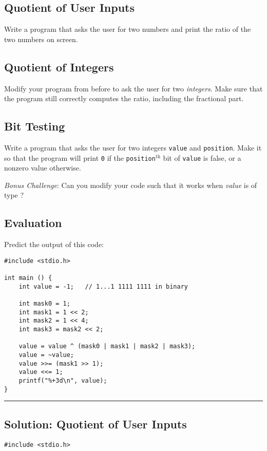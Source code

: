{\subsection*{Quotient of User Inputs}
Write a program that asks the user for two numbers and print the ratio of the two numbers on screen.

\subsection*{Quotient of Integers}
Modify your program from before to ask the user for two \emph{integers}. Make sure that the program still correctly computes the ratio, including the fractional part.

\subsection*{Bit Testing}
Write a program that asks the user for two integers \texttt{value} and \texttt{position}. Make it so that the program will print \texttt{0} if the \texttt{position}$^\text{th}$ bit of \texttt{value} is false, or a nonzero value otherwise.

\emph{Bonus Challenge}: Can you modify your code such that it works when \emph{value} is of type ?

\subsection*{Evaluation}
Predict the output of this code:
\begin{codebox}[exo4-4.c]
\begin{verbatim}
#include <stdio.h>

int main () {
    int value = -1;   // 1...1 1111 1111 in binary

    int mask0 = 1;
    int mask1 = 1 << 2;
    int mask2 = 1 << 4;
    int mask3 = mask2 << 2;

    value = value ^ (mask0 | mask1 | mask2 | mask3);
    value = ~value;
    value >>= (mask1 >> 1);
    value <<= 1;
    printf("%+3d\n", value);
}
\end{verbatim}
\end{codebox}


\rule{\linewidth}{0.1mm}


\subsection*{Solution: Quotient of User Inputs}
\begin{codebox}[exo4-1.c]
\begin{verbatim}
#include <stdio.h>


\end{verbatim}
\end{codebox}}
